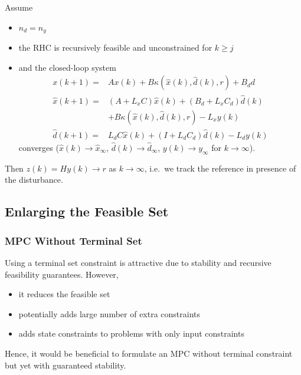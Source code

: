 Assume
\begin{itemize}
    \item $n_d = n_y$
    \item the RHC is recursively feasible and unconstrained for $k \geq j$
    \item and the closed-loop system
          \begin{align*}
              x(k+1)        =     & Ax(k) + B \kappa(\widehat{x}(k), \widehat{d}(k), r) + B_d d    \\
              \widehat{x}(k+1)  = & (A + L_x C) \widehat{x}(k) + (B_d + L_x C_d) \widehat{d}(k)    \\
                                  & + B \kappa(\widehat{x}(k), \widehat{d}(k), r) - L_x y(k)       \\
              \widehat{d}(k+1)  = & L_d C \widehat{x}(k) + (I + L_d C_d) \widehat{d}(k) - L_d y(k)
          \end{align*}
          converges ($\widehat{x}(k)\rightarrow \widehat{x}_{\infty}$, $\widehat{d}(k)\rightarrow \widehat{d}_{\infty}$, $y(k)\rightarrow y_{\infty}$ for $k\rightarrow \infty$).
\end{itemize}
Then $z(k) = Hy(k) \to r$ as $k \to \infty$, i.e.\ we track the reference in presence of the disturbance.

\subsection{Enlarging the Feasible Set}
\subsubsection{MPC Without Terminal Set}
Using a terminal set constraint is attractive due to stability and recursive feasibility guarantees. However,
\begin{itemize}
    \item it reduces the feasible set
    \item potentially adds large number of extra constraints
    \item adds state constraints to problems with only input constraints
\end{itemize}
Hence, it would be beneficial to formulate an MPC without terminal constraint but yet with guaranteed stability.
\newpar{}

